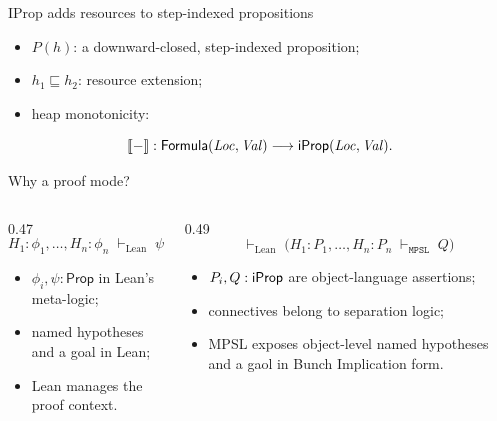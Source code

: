 \documentclass[10pt,aspectratio=169]{beamer}
\begin{document}
\begin{frame}{IProp adds resources to step-indexed propositions}

  \begin{itemize}
    \item $P(h)$: a downward-closed, step-indexed proposition;
    \item $h_1\sqsubseteq h_2$: resource extension;
    \item heap monotonicity:
  \end{itemize}


  \[
    \llbracket - \rrbracket : \mathsf{Formula}(\mathit{Loc},\mathit{Val})
      \longrightarrow \mathsf{iProp}(\mathit{Loc},\mathit{Val}).
  \]
\end{frame}

\begin{frame}{Why a proof mode?}
  \begin{columns}[T,onlytextwidth]
    \begin{column}{0.47\textwidth}
      \[
        H_1:\phi_1,\ldots,H_n:\phi_n
        \;\vdash_{\mathrm{Lean}}\;\psi
      \]
      \begin{itemize}
        \item $\phi_i,\psi : \mathsf{Prop}$ in Lean's meta-logic;
        \item named hypotheses and a goal in Lean;
        \item Lean manages the proof context.
      \end{itemize}
    \end{column}%
    \begin{column}{0.49\textwidth}
      \[
        \vdash_{\mathrm{Lean}}\;
        \bigl(H_1:P_1,\ldots,H_n:P_n
          \;\vdash_{\texttt{MPSL}}\;Q\bigr)
      \]
      \begin{itemize}
        \item $P_i,Q : \mathsf{iProp}$ are object-language assertions;
        \item connectives belong to separation logic;
        \item MPSL exposes object-level named hypotheses and a gaol in Bunch Implication form.
      \end{itemize}
    \end{column}
  \end{columns}
\end{frame}
\end{document}
